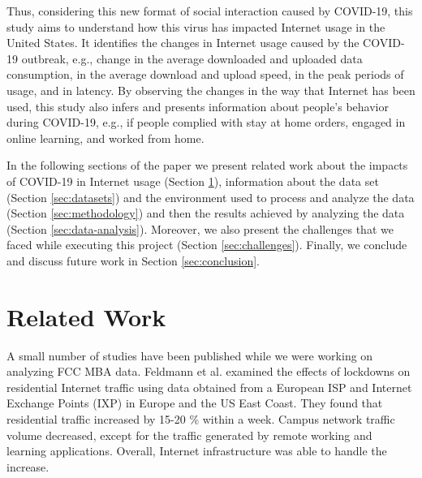 \documentclass[conference,10pt]{IEEEtran}
\begin{document}
Thus, considering this new format of social interaction caused by COVID-19, this study aims to understand how this virus has impacted Internet usage in the United States. It identifies the changes in Internet usage caused by the COVID-19 outbreak, e.g., change in the average downloaded and uploaded data consumption, in the average download and upload speed, in the peak periods of usage, and in latency. By observing the changes in the way that Internet has been used, this study also infers and presents information about people's behavior during COVID-19, e.g., if people complied with stay at home orders, engaged in online learning, and worked from home.

In the following sections of the paper we present related work about the impacts of COVID-19 in Internet usage (Section \ref{sec:related-work}), information about the data set (Section \ref{sec:datasets}) and the environment used to process and analyze the data (Section \ref{sec:methodology}) and then the results achieved by analyzing the data (Section \ref{sec:data-analysis}). Moreover, we also present the challenges that we faced while executing this project (Section \ref{sec:challenges}). Finally, we conclude and discuss future work in Section \ref{sec:conclusion}.

\section{Related Work}
\label{sec:related-work}

A small number of studies have been published while we were working on analyzing FCC MBA data. Feldmann et al. examined the effects of lockdowns on residential Internet traffic using data obtained from a European ISP and Internet Exchange Points (IXP) in Europe and the US East Coast\cite{feldmann2020lockdown}. They found that residential traffic increased by 15-20 \% within a week. Campus network traffic volume decreased, except for the traffic generated by remote working and learning applications. Overall, Internet infrastructure was able to handle the increase.

\nocite{openvault}
\nocite{uk-home-broadband-performance}
\nocite{samknows-cdn}
\nocite{samknows-video-streaming}
\nocite{samknows-video-conferencing}
\nocite{lutu2020characterization}
\nocite{liu2020characterizing}
\nocite{partridge2003internet}
\end{document}
